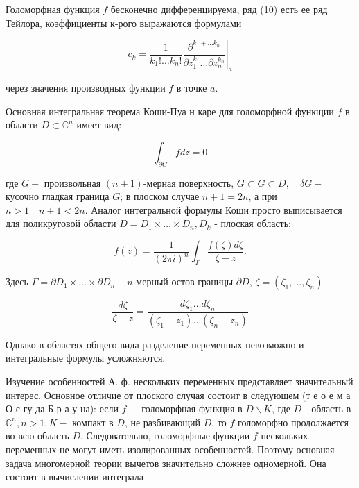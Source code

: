 \documentclass[10pt]{article}
\begin{document}
Голоморфная функция $f$ бесконечно дифференцируема, ряд (10) есть ее ряд Тейлора, коэффициенты к-рого выражаются формулами



\[

c_{k}=\left.\frac{1}{k_{1} ! \ldots k_{n} !} \frac{\partial^{k_{1}+\ldots k_{n}}}{\partial z_{1}^{k_{1}} \ldots \partial z_{n}^{k_{n}}}\right|_{a}

\]



через значения производных функции $f$ в точке $a$.



Основная интегральная теорема Коши-Пуа н каре для голоморфной функщии $f$ в области $D \subset \mathbb{C}^{n}$ имеет вид:



\[

\int_{\partial G} f d z=0

\]



где $G-$ произвольная $(n+1)$-мерная поверхность, $G \subset \bar{G} \subset D, \quad \delta G-$ кусочно гладкая граница $G$; в плоском случае $n+1=2 n$, а при $n>1 \quad n+1<2 n$. Аналог интегральной формулы Коши просто выписывается для поликруговой области $D=D_{1} \times \ldots \times D_{n}, D_{k}$ - плоская область:



\[

f(z)=\frac{1}{(2 \pi i)^{n}} \int_{\Gamma} \frac{f(\zeta) d \zeta}{\zeta-z} .

\]



Здесь $\Gamma=\partial D_{1} \times \ldots \times \partial D_{n}-n$-мерный остов границы $\partial D$, $\zeta=\left(\zeta_{1}, \ldots, \zeta_{n}\right)$



\[

\frac{d \zeta}{\zeta-z}=\frac{d \zeta_{1} \ldots d \zeta_{n}}{\left(\zeta_{1}-z_{1}\right) \ldots\left(\zeta_{n}-z_{n}\right)}

\]



Однако в областях общего вида разделение переменных невозможно и интегральные формулы усложняются.



Изучение особенностей А. ф. нескольких переменных представляет значительный интерес. Основное отличие от плоского случая состоит в следующем (т е о е м а О с гу да-Б р а у на): если $f-$ голоморфная функция в $D \backslash K$, где $D$ - область в $\mathbb{C}^{n}, n>1, K-$ компакт в $D$, не разбивающий $D$, то $f$ голоморфно продолжается во всю область $D$. Следовательно, голоморфные функции $f$ нескольких переменных не могут иметь изолированных особенностей. Поэтому основная задача многомерной теории вычетов значительно сложнее одномерной. Она состоит в вычислении интеграла
\end{document}
